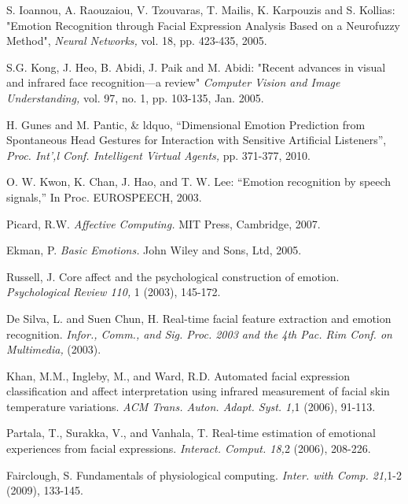 
\begin{thebibliography}{9}



S. Ioannou, A. Raouzaiou, V. Tzouvaras, T. Mailis, K. Karpouzis and S. Kollias: "Emotion Recognition through Facial Expression Analysis Based on a Neurofuzzy Method",
\textit{ Neural Networks, }
vol. 18, pp. 423-435, 2005.



 S.G. Kong, J. Heo, B. Abidi, J. Paik and M. Abidi: "Recent advances in visual and infrared face recognition—a review"
 \textit{ Computer Vision and Image Understanding,}
 vol. 97, no. 1, pp. 103-135, Jan. 2005.
 
 

H. Gunes and M. Pantic, \& ldquo, “Dimensional Emotion Prediction from Spontaneous Head Gestures for Interaction with Sensitive Artificial Listeners”,
\textit{ Proc. Int',l Conf. Intelligent  
     Virtual Agents,}
pp. 371-377, 2010. 

O. W. Kwon, K. Chan, J. Hao, and T. W. Lee: “Emotion recognition by speech signals,” In Proc. EUROSPEECH, 2003.


Picard, R.W. 
\textit{Affective Computing.}
 MIT Press, Cambridge, 2007.
 
Ekman, P. 
\textit{Basic Emotions.}
John Wiley and Sons, Ltd, 2005.

Russell, J. Core affect and the psychological
construction of emotion. 
\textit{ Psychological Review 110,}
 1
(2003), 145-172.

De Silva, L. and Suen Chun, H. Real-time facial
feature extraction and emotion recognition.
\textit{ Infor.,
Comm., and Sig. Proc. 2003 and the 4th Pac. Rim
Conf. on Multimedia,}
(2003).

Khan, M.M., Ingleby, M., and Ward, R.D. Automated
facial expression classification and affect interpretation
using infrared measurement of facial skin temperature
variations.
\textit{ ACM Trans. Auton. Adapt. Syst. 1,}1 (2006),
91-113.


Partala, T., Surakka, V., and Vanhala, T. Real-time
estimation of emotional experiences from facial
expressions.
\textit{ Interact. Comput. 18,}2 (2006), 208-226.


Fairclough, S. Fundamentals of physiological
computing.
\textit{ Inter. with Comp. 21,}1-2 (2009), 133-145.



\end{thebibliography}
